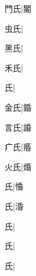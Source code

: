 \begin{multicols}{2}
{{\cjk{}{\cnsym{}　}門氏}\mktsJzrVerticalBar{}{\cjk{}{\cnsym{}　}{\cnsym{}　}{\cnsym{}　}}|{\cjk{}閽}\par
{\cjk{}{\cnsym{}　}虫氏}\mktsJzrVerticalBar{}{\cjk{}{\cnsym{}　}{\cnsym{}　}{\cnsym{}　}}|{}\par
{\cjk{}{\cnsym{}　}黑氏}\mktsJzrVerticalBar{}{\cjk{}{\cnsym{}　}{\cnsym{}　}{\cnsym{}　}}|{}\par
{\cjk{}{\cnsym{}　}禾氏}\mktsJzrVerticalBar{}{\cjk{}{\cnsym{}　}{\cnsym{}　}{\cnsym{}　}}|{}\par
{氏}\mktsJzrVerticalBar{}{\cjk{}{\cnsym{}　}{\cnsym{}　}{\cnsym{}　}}|{}\par
{\cjk{}{\cnsym{}　}金氏}\mktsJzrVerticalBar{}{\cjk{}{\cnsym{}　}{\cnsym{}　}{\cnsym{}　}}|{\cjk{}錉}\par
{\cjk{}{\cnsym{}　}言氏}\mktsJzrVerticalBar{}{\cjk{}{\cnsym{}　}{\cnsym{}　}{\cnsym{}　}}|{\cjk{}諙}\par
{\cjk{}{\cnsym{}　}疒氏}\mktsJzrVerticalBar{}{\cjk{}{\cnsym{}　}{\cnsym{}　}{\cnsym{}　}}|{\cjk{}痻}\par
{\cjk{}{\cnsym{}　}火氏}\mktsJzrVerticalBar{}{\cjk{}{\cnsym{}　}{\cnsym{}　}{\cnsym{}　}}|{\cjk{}焝}\par
{氏}\mktsJzrVerticalBar{}{\cjk{}{\cnsym{}　}{\cnsym{}　}{\cnsym{}　}}|{\cjk{}惛}\par
{氏}\mktsJzrVerticalBar{}{\cjk{}{\cnsym{}　}{\cnsym{}　}{\cnsym{}　}}|{\cjk{}涽}\par
{氏}\mktsJzrVerticalBar{}{\cjk{}{\cnsym{}　}{\cnsym{}　}{\cnsym{}　}}|{}\par
{氏}\mktsJzrVerticalBar{}{\cjk{}{\cnsym{}　}{\cnsym{}　}{\cnsym{}　}}|{}\par
{氏}\mktsJzrVerticalBar{}{\cjk{}{\cnsym{}　}{\cnsym{}　}{\cnsym{}　}}|{}\par
}
\end{multicols}
